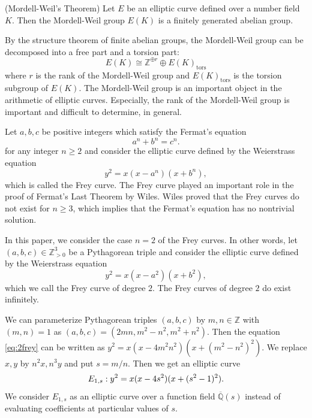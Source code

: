 \documentclass[main]{subfiles}
\begin{document}
\begin{thm}{(Mordell-Weil's Theorem)}
    \label{thm:mordell}
    Let $E$ be an elliptic curve defined over a number field $K$.
    Then the Mordell-Weil group $E(K)$ is a finitely generated abelian group.
\end{thm}
By the structure theorem of finite abelian groups, the Mordell-Weil group can be decomposed into a free part and a torsion part:
\begin{equation*}
    E(K) \cong \mathbb{Z}^{\oplus r} \oplus E(K)_{\text{tors}}
\end{equation*}
where $r$ is the rank of the Mordell-Weil group and $E(K)_{\text{tors}}$ is the torsion subgroup of $E(K)$.
The Mordell-Weil group is an important object in the arithmetic of elliptic curves.
Especially, the rank of the Mordell-Weil group is important and difficult to determine, in general.

Let $a,b,c$ be positive integers which satisfy the Fermat's equation
\begin{equation*}
    a^{n} + b^{n} = c^{n}.
\end{equation*}
for any integer $n \geq 2$ and consider the elliptic curve defined by the Weierstrass equation
\begin{equation*}
    y^{2} = x(x - a^{n})(x + b^{n}),
\end{equation*}
which is called the Frey curve.
The Frey curve played an important role in the proof of Fermat's Last Theorem by Wiles.
Wiles proved that the Frey curves do not exist for $n \geq 3$, which implies that the Fermat's equation has no nontrivial solution.

In this paper, we consider the case $n=2$ of the Frey curves.
In other words, let $(a,b,c) \in \mathbb{Z}_{> 0}^3$ be a Pythagorean triple and consider the elliptic curve defined by the Weierstrass equation
\begin{equation}
    \label{eq:2frey}
    y^{2} = x(x - a^{2})(x + b^{2}),
\end{equation}
which we call the Frey curve of degree $2$.
The Frey curves of degree $2$ do exist infinitely.

We can parameterize Pythagorean triples $(a,b,c)$ by $m,n \in \mathbb{Z}$ with $(m,n)=1$ as $(a,b,c) = (2mn, m^{2} - n^{2}, m^{2} + n^{2})$.
Then the equation \eqref{eq:2frey} can be written as $y^{2} = x(x - 4m^2n^2)(x + (m^{2} - n^2)^{2})$.
We replace $x,y$ by $n^2x, n^3y$ and put $s = m/n$.
Then we get an elliptic curve
\begin{equation}
    \label{eq:E_{1,s}}
    E_{1,s}: y^{2} = x(x - 4s^{2})(x + (s^{2} - 1)^{2}).
\end{equation}
We consider $E_{1,s}$ as an elliptic curve over a function field $\overline{\mathbb{Q}}(s)$ instead of evaluating coefficients at particular values of $s$.
\end{document}
